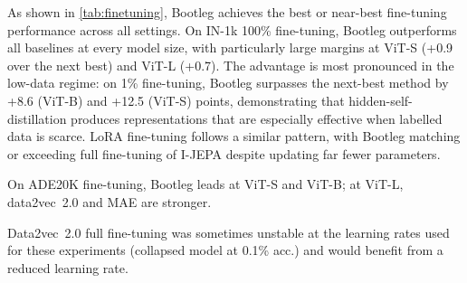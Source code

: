 As shown in \cref{tab:finetuning}, Bootleg achieves the best or near-best fine-tuning performance across all settings.
On IN-1k 100\% fine-tuning, Bootleg outperforms all baselines at every model size, with particularly large margins at ViT-S (+0.9 over the next best) and ViT-L (+0.7).
The advantage is most pronounced in the low-data regime: on 1\% fine-tuning, Bootleg surpasses the next-best method by +8.6 (ViT-B) and +12.5 (ViT-S) points, demonstrating that hidden-self-distillation produces representations that are especially effective when labelled data is scarce.
LoRA fine-tuning follows a similar pattern, with Bootleg matching or exceeding full fine-tuning of I-JEPA despite updating far fewer parameters.

On ADE20K fine-tuning, Bootleg leads at ViT-S and ViT-B; at ViT-L, data2vec~2.0 and MAE are stronger.

Data2vec~2.0 full fine-tuning was sometimes unstable at the learning rates used for these experiments (collapsed model at 0.1\% acc.) and would benefit from a reduced learning rate.

